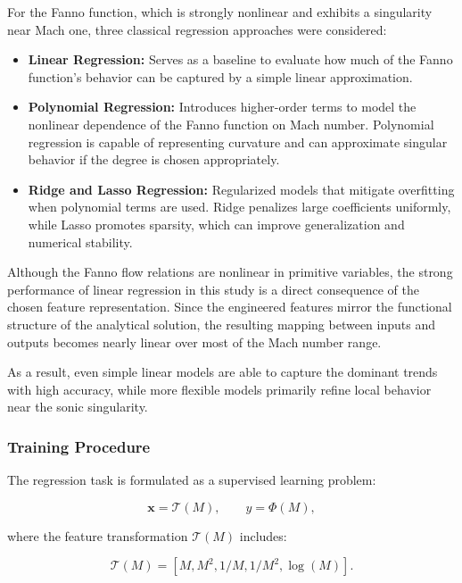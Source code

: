 \documentclass[11pt,a4paper]{report}
\begin{document}
For the Fanno function, which is strongly nonlinear and exhibits a singularity near Mach one, three classical regression approaches were considered:

\begin{itemize}
    \item \textbf{Linear Regression:} Serves as a baseline to evaluate how much of the Fanno function's behavior can be captured by a simple linear approximation.  
    \item \textbf{Polynomial Regression:} Introduces higher-order terms to model the nonlinear dependence of the Fanno function on Mach number. Polynomial regression is capable of representing curvature and can approximate singular behavior if the degree is chosen appropriately.  
    \item \textbf{Ridge and Lasso Regression:} Regularized models that mitigate overfitting when polynomial terms are used. Ridge penalizes large coefficients uniformly, while Lasso promotes sparsity, which can improve generalization and numerical stability.
\end{itemize}

Although the Fanno flow relations are nonlinear in primitive variables,
the strong performance of linear regression in this study is a direct
consequence of the chosen feature representation. Since the engineered
features mirror the functional structure of the analytical solution,
the resulting mapping between inputs and outputs becomes nearly linear
over most of the Mach number range.

As a result, even simple linear models are able to capture the dominant
trends with high accuracy, while more flexible models primarily refine
local behavior near the sonic singularity.

\subsubsection{Training Procedure}

The regression task is formulated as a supervised learning problem:

\begin{equation}
\mathbf{x} = \mathcal{T}(M), \qquad y = \Phi(M),
\end{equation}

where the feature transformation $\mathcal{T}(M)$ includes:

\begin{equation}
\mathcal{T}(M) = [M, M^2, 1/M, 1/M^2, \log(M)].
\end{equation}
\end{document}
